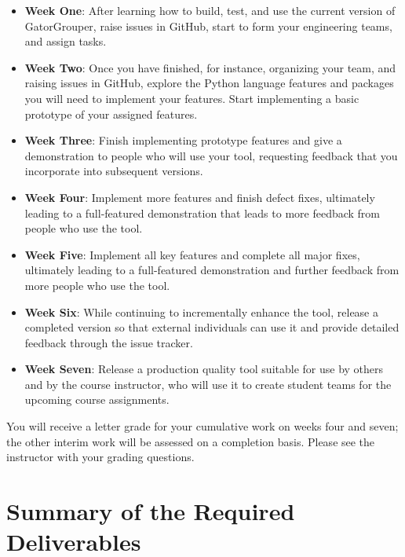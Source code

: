 \documentclass[11pt]{article}
\begin{document}
\begin{itemize}

  \setlength{\itemsep}{0pt}

  \item {\bf Week One}: After learning how to build, test, and use the current
    version of GatorGrouper, raise issues in GitHub, start to form your
    engineering teams, and assign tasks.

  \item {\bf Week Two}: Once you have finished, for instance, organizing your
    team, and raising issues in GitHub, explore the Python language features and
    packages you will need to implement your features. Start implementing a
    basic prototype of your assigned features.

  \item {\bf Week Three}: Finish implementing prototype features and give a
    demonstration to people who will use your tool, requesting feedback that you
    incorporate into subsequent versions.

  \item {\bf Week Four}: Implement more features and finish defect fixes,
    ultimately leading to a full-featured demonstration that leads to more
    feedback from people who use the tool.

  \item {\bf Week Five}: Implement all key features and complete all major
    fixes, ultimately leading to a full-featured demonstration and further
    feedback from more people who use the tool.

  \item {\bf Week Six}: While continuing to incrementally enhance the tool,
    release a completed version so that external individuals can use it and
    provide detailed feedback through the issue tracker.

  \item {\bf Week Seven}: Release a production quality tool suitable for use by
    others and by the course instructor, who will use it to create student teams
    for the upcoming course assignments.

\end{itemize}

\noindent You will receive a letter grade for your cumulative work on weeks four
and seven; the other interim work will be assessed on a completion basis. Please
see the instructor with your grading questions.

\section*{Summary of the Required Deliverables}
\end{document}
